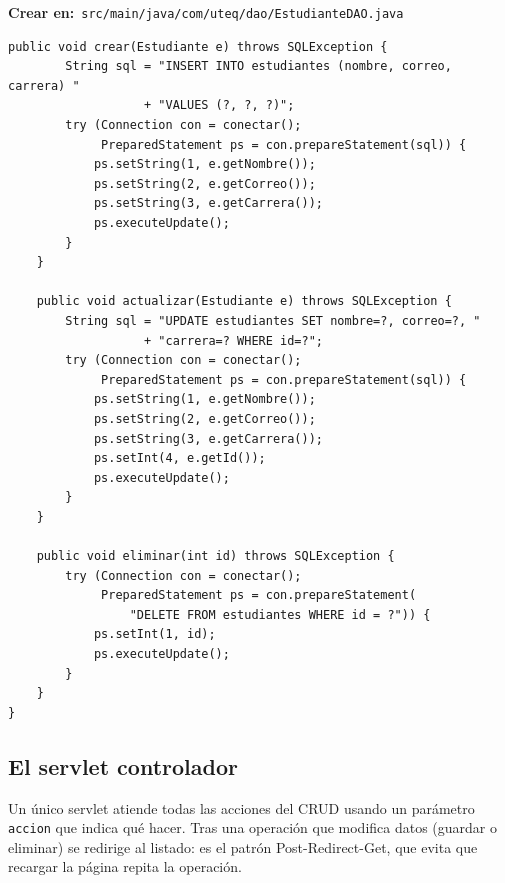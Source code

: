 \documentclass[11pt]{article}
\begin{document}
\vspace{2pt}
{\small\color{jwebazulo}\textbf{Crear en:}~}\texttt{src/\allowbreak{}main/\allowbreak{}java/\allowbreak{}com/\allowbreak{}uteq/\allowbreak{}dao/\allowbreak{}Estudiante\allowbreak{}DAO.\allowbreak{}java}\par\nobreak\vspace{-1pt}
\begin{cajacodigo}
\begin{lstlisting}[style=java]
    public void crear(Estudiante e) throws SQLException {
        String sql = "INSERT INTO estudiantes (nombre, correo, carrera) "
                   + "VALUES (?, ?, ?)";
        try (Connection con = conectar();
             PreparedStatement ps = con.prepareStatement(sql)) {
            ps.setString(1, e.getNombre());
            ps.setString(2, e.getCorreo());
            ps.setString(3, e.getCarrera());
            ps.executeUpdate();
        }
    }

    public void actualizar(Estudiante e) throws SQLException {
        String sql = "UPDATE estudiantes SET nombre=?, correo=?, "
                   + "carrera=? WHERE id=?";
        try (Connection con = conectar();
             PreparedStatement ps = con.prepareStatement(sql)) {
            ps.setString(1, e.getNombre());
            ps.setString(2, e.getCorreo());
            ps.setString(3, e.getCarrera());
            ps.setInt(4, e.getId());
            ps.executeUpdate();
        }
    }

    public void eliminar(int id) throws SQLException {
        try (Connection con = conectar();
             PreparedStatement ps = con.prepareStatement(
                 "DELETE FROM estudiantes WHERE id = ?")) {
            ps.setInt(1, id);
            ps.executeUpdate();
        }
    }
}
\end{lstlisting}
\end{cajacodigo}
\vspace{2pt}
\subsection{El servlet controlador}
Un único servlet atiende todas las acciones del CRUD usando un parámetro \texttt{accion} que indica qué hacer. Tras una operación que modifica datos (guardar o eliminar) se redirige al listado: es el patrón Post-Redirect-Get, que evita que recargar la página repita la operación.
\end{document}
